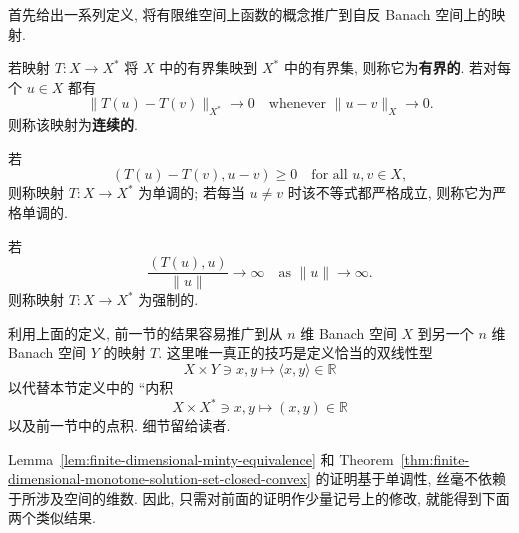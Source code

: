 首先给出一系列定义, 将有限维空间上函数的概念推广到自反 Banach 空间上的映射.

\begin{Definition}
\label{def:banach-nonlinear-bounded-continuous-mapping}
若映射 $T:X\to X^*$ 将 $X$ 中的有界集映到 $X^*$ 中的有界集, 则称它为\textbf{有界的}. 若对每个 $u\in X$ 都有
\begin{equation}\label{eq:banach-nonlinear-mapping-continuity-definition}
\|T(u)-T(v)\|_{X^*}\to0\quad\text{whenever }\|u-v\|_X\to0.
\end{equation}
则称该映射为\textbf{连续的}.
\end{Definition}

\begin{Definition}
\label{def:banach-nonlinear-monotone-mapping}
若
\begin{equation}\label{eq:banach-nonlinear-mapping-monotonicity-definition}
(T(u)-T(v),u-v)\geq0\quad\text{for all }u,v\in X,
\end{equation}
则称映射 $T:X\to X^*$ 为单调的; 若每当 $u\neq v$ 时该不等式都严格成立, 则称它为严格单调的.
\end{Definition}

\begin{Definition}
\label{def:banach-nonlinear-coercive-mapping}
若
\begin{equation}\label{eq:banach-nonlinear-mapping-coercivity-definition}
\dfrac{(T(u),u)}{\|u\|}\to\infty\quad\text{as }\|u\|\to\infty.
\end{equation}
则称映射 $T:X\to X^*$ 为强制的.
\end{Definition}

\begin{Remark}
\label{rem:finite-banach-pairing-generalization}
利用上面的定义, 前一节的结果容易推广到从 $n$ 维 Banach 空间 $X$ 到另一个 $n$ 维 Banach 空间 $Y$ 的映射 $T$. 这里唯一真正的技巧是定义恰当的双线性型
\begin{equation}\label{eq:finite-banach-spaces-appropriate-bilinear-pairing}
X\times Y\ni x,y\mapsto\langle x,y\rangle\in\mathbb{R}
\end{equation}
以代替本节定义中的 ``内积\textquotesingle\textquotesingle
\begin{equation}\label{eq:banach-space-dual-inner-product-notation}
X\times X^*\ni x,y\mapsto(x,y)\in\mathbb{R}
\end{equation}
以及前一节中的点积. 细节留给读者.
\end{Remark}

Lemma~\ref{lem:finite-dimensional-minty-equivalence} 和 Theorem~\ref{thm:finite-dimensional-monotone-solution-set-closed-convex} 的证明基于单调性, 丝毫不依赖于所涉及空间的维数. 因此, 只需对前面的证明作少量记号上的修改, 就能得到下面两个类似结果.


